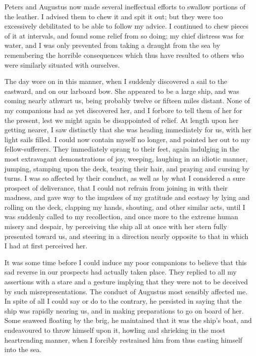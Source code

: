 Peters and Augustus now made several ineffectual efforts to swallow portions
of the leather. I advised them to chew it and spit it out; but they were too
excessively debilitated to be able to follow my advice. I continued to chew
pieces of it at intervals, and found some relief from so doing; my chief
distress was for water, and I was only prevented from taking a draught from the
sea by remembering the horrible consequences which thus have resulted to others
who were similarly situated with ourselves. 

The day wore on in this manner, when I suddenly discovered a sail to the
eastward, and on our larboard bow. She appeared to be a large ship, and was
coming nearly athwart us, being probably twelve or fifteen miles distant. None
of my companions had as yet discovered her, and I forbore to tell them of her
for the present, lest we might again be disappointed of relief. At length upon
her getting nearer, I saw distinctly that she was heading immediately for us,
with her light sails filled. I could now contain myself no longer, and pointed
her out to my fellow-sufferers. They immediately sprang to their feet, again
indulging in the most extravagant demonstrations of joy, weeping, laughing in an
idiotic manner, jumping, stamping upon the deck, tearing their hair, and praying
and cursing by turns. I was so affected by their conduct, as well as by what I
considered a sure prospect of deliverance, that I could not refrain from joining
in with their madness, and gave way to the impulses of my gratitude and ecstasy
by lying and rolling on the deck, clapping my hands, shouting, and other similar
acts, until I was suddenly called to my recollection, and once more to the
extreme human misery and despair, by perceiving the ship all at once with her
stern fully presented toward us, and steering in a direction nearly opposite to
that in which I had at first perceived her. 

It was some time before I could induce my poor companions to believe that
this sad reverse in our prospects had actually taken place. They replied to all
my assertions with a stare and a gesture implying that they were not to be
deceived by such misrepresentations. The conduct of Augustus most sensibly
affected me. In spite of all I could say or do to the contrary, he persisted in
saying that the ship was rapidly nearing us, and in making preparations to go on
board of her. Some seaweed floating by the brig, he maintained that it was the
ship's boat, and endeavoured to throw himself upon it, howling and shrieking in
the most heartrending manner, when I forcibly restrained him from thus casting
himself into the sea. 

